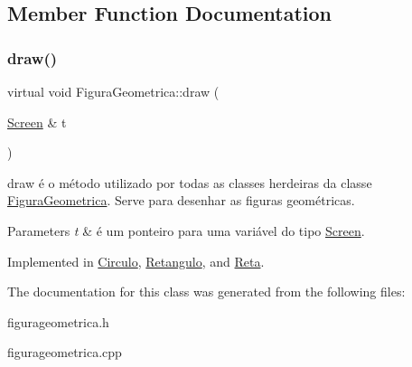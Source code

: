\subsection{Member Function Documentation}
\mbox{\label{classFiguraGeometrica_a8ee8dedc060b6059a805ea091aef2c41}} 
\subsubsection{\texorpdfstring{draw()}{draw()}}
{\footnotesize\ttfamily virtual void Figura\+Geometrica\+::draw (\begin{DoxyParamCaption}\item[{\hyperlink{classScreen}{Screen} \&}]{t }\end{DoxyParamCaption})\hspace{0.3cm}{\ttfamily [pure virtual]}}



draw é o método utilizado por todas as classes herdeiras da classe \hyperlink{classFiguraGeometrica}{Figura\+Geometrica}. Serve para desenhar as figuras geométricas. 


\begin{DoxyParams}{Parameters}
{\em t} & é um ponteiro para uma variável do tipo \hyperlink{classScreen}{Screen}. \\
\hline
\end{DoxyParams}


Implemented in \hyperlink{classCirculo_a593787d6e0618c2eded23e8839e7bea6}{Circulo}, \hyperlink{classRetangulo_ac088dd6d3f4f3d3f80363a868c2e74f1}{Retangulo}, and \hyperlink{classReta_ac2e9805183cd474b62bffd8b032cd780}{Reta}.



The documentation for this class was generated from the following files\+:\begin{DoxyCompactItemize}
\item 
figurageometrica.\+h\item 
figurageometrica.\+cpp\end{DoxyCompactItemize}
